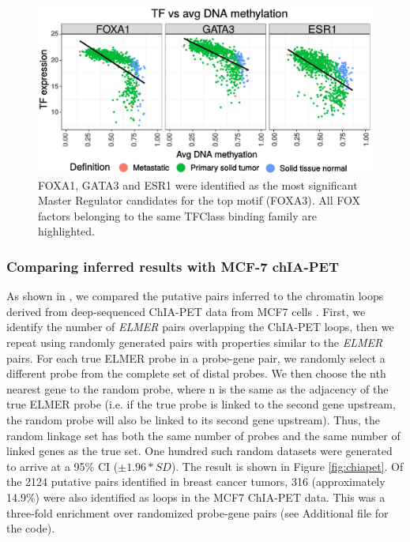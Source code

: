 \begin{figure}
\centering
\includegraphics[width=1.0\textwidth]{images/scatter_font.pdf}
\caption{\label{fig:scatter} FOXA1, GATA3 and ESR1 were identified as the most significant Master Regulator candidates for the top motif (FOXA3). All FOX factors belonging to the same TFClass binding family are highlighted.}
\end{figure}



\subsubsection*{Comparing inferred results with MCF-7 chIA-PET}

As shown in , we compared the putative pairs inferred to the chromatin loops derived from deep-sequenced ChIA-PET data from MCF7 cells \cite{li2012extensive}. First, we identify the number of \textit{ELMER} pairs overlapping the ChIA-PET loops, then we repeat using randomly generated  pairs with properties similar to the \textit{ELMER} pairs. For each true ELMER probe in a probe-gene pair, we randomly select a different probe from the complete set of distal probes. We then choose the nth nearest gene to the random probe, where n is the same as the adjacency of the true ELMER probe (i.e. if the true probe is linked to the second gene upstream, the  random probe will also be linked to its second gene upstream). Thus, the random linkage set has both the same number of probes and the same number of linked genes as the true set. One hundred such random datasets were generated to arrive at a 95\% CI ($\pm 1.96* SD$).
The result is shown in Figure \ref{fig:chiapet}. Of the 2124 putative pairs identified in breast cancer tumors, 316 (approximately 14.9\%) were also identified as loops in the MCF7 ChIA-PET data. This was a three-fold enrichment over randomized probe-gene pairs (see Additional file for the code).


